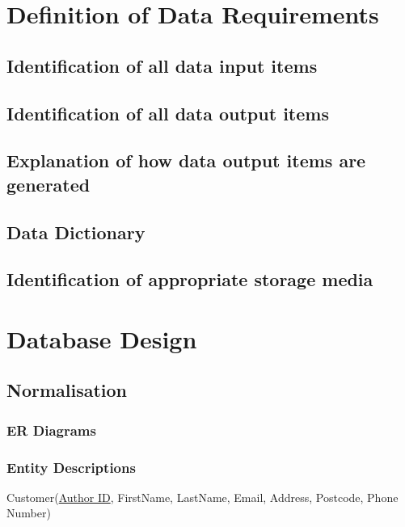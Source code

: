 \section{Definition of Data Requirements}

\subsection{Identification of all data input items}

\subsection{Identification of all data output items}

\subsection{Explanation of how data output items are generated}

\subsection{Data Dictionary}

\subsection{Identification of appropriate storage media}



\section{Database Design}


\subsection{Normalisation}

\subsubsection{ER Diagrams}

\subsubsection{Entity Descriptions}

Customer(\underline{Author ID}, FirstName, LastName, Email, Address, Postcode, Phone Number)

